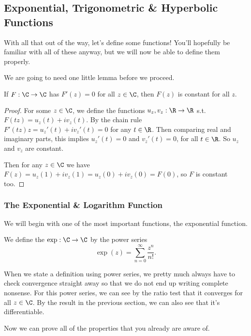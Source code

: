 \subsection{Exponential, Trigonometric \& Hyperbolic Functions}

With all that out of the way, let's define some functions! You'll hopefully be familiar with all of these anyway, but we will now be able to define them properly.

We are going to need one little lemma before we proceed.

\begin{lemma}
	If $F: \C \rightarrow \C$ has $F'(z) = 0$ for all $z \in \C$, then $F(z)$ is constant for all $z$.
\end{lemma}
\begin{proof}
	For some $z \in \C$, we define the functions $u_z, v_z : \R \rightarrow \R$ s.t. 
	$F(tz) = u_z(t) + i v_z(t)$.  By the chain rule $F'(tz) z = u_z'(t) + iv_z'(t) = 0$ for any $t \in \R$.	
	Then comparing real and imaginary parts, this implies $u_z'(t) = 0$ and $v_z'(t) = 0$, for all $t \in \R$.  So $u_z$ and $v_z$ are constant.

	Then for any $z \in \C$ we have $F(z) = u_z(1) + i v_z(1) = u_z(0) + i v_z(0) = F(0)$, so $F$ is constant too.
\end{proof}

\subsubsection{The Exponential \& Logarithm Function}

We will begin with one of the most important functions, the exponential function.

\begin{definition}
	We define the  $\exp: \C \rightarrow \C$ by the power series
	$$
	\exp(z) = \sum_{n = 0}^{\infty} \frac{z^n}{n!}.
	$$
\end{definition}

When we state a definition using power series, we pretty much always have to check convergence straight away so that we do not end up writing complete nonsense.
For this power series, we can see by the ratio test that it converges for all $z \in \C$. By the result in the previous section, we can also see that it's differentiable.

Now we can prove all of the properties that you already are aware of.

